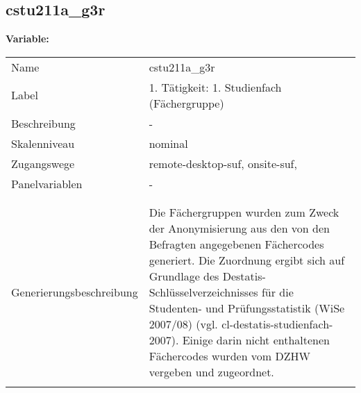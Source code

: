 	
	
	\subsection{cstu211a\_g3r}
	\label{subSection:cstu211a_g3r}

	\noindent\textbf{Variable:}\\
		\begin{tabular}{lL{11.3cm}}
			\label{tableVariable:cstu211a_g3r}
			Name & cstu211a\_g3r \\
			Label & 1. Tätigkeit: 1. Studienfach (Fächergruppe) \\
			Beschreibung & - \\
			Skalenniveau & nominal \\
			Zugangswege &
				remote-desktop-suf,
				onsite-suf,
 \\
			Panelvariablen & -
			 \\
			 \\
 \\
					Generierungsbeschreibung & Die Fächergruppen wurden zum Zweck der Anonymisierung aus den von den Befragten angegebenen Fächercodes generiert. Die Zuordnung ergibt sich auf Grundlage des Destatis-Schlüsselverzeichnisses für die Studenten- und Prüfungsstatistik (WiSe 2007/08) (vgl. cl-destatis-studienfach-2007).  Einige darin nicht enthaltenen Fächercodes wurden vom DZHW vergeben und zugeordnet. 
				 \\	
			 \\
		\end{tabular}







